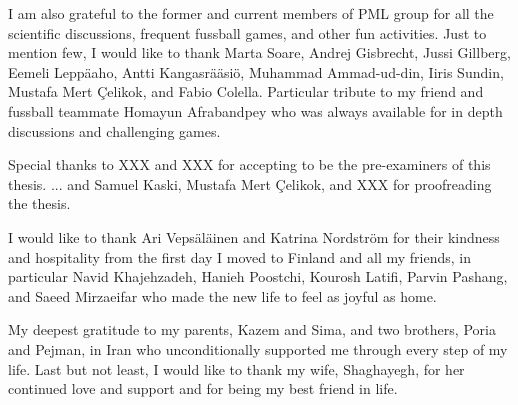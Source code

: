 \documentclass[dissertation,math,vertlayout,pdfa,colorlinks]{aaltoseries}
\begin{document}
\begin{preface}[Espoo]
I am also grateful to the former and current members of PML group for all the scientific discussions, frequent fussball games, and other fun activities. Just to mention few, I would like to thank Marta Soare, Andrej Gisbrecht, Jussi Gillberg, Eemeli Leppäaho, Antti Kangasrääsiö, Muhammad Ammad-ud-din, Iiris Sundin, Mustafa Mert \c{C}elikok, and Fabio Colella. Particular tribute to my friend and fussball teammate Homayun Afrabandpey who was always available for in depth discussions and challenging games. 

Special thanks to XXX and XXX for accepting to be the pre-examiners of this thesis. ... %
and Samuel Kaski, Mustafa Mert \c{C}elikok, and XXX for proofreading the thesis. 

I would like to thank Ari Vepsäläinen and Katrina Nordström for their kindness and hospitality from the first day I moved to Finland and all my friends, in particular Navid Khajehzadeh, Hanieh Poostchi, Kourosh Latifi, Parvin Pashang, and Saeed Mirzaeifar who made the new life to feel as joyful as home. %

My deepest gratitude to my parents, Kazem and Sima, and two brothers, Poria and Pejman, in Iran who unconditionally supported me through every step of my life. Last but not least, I would like to thank my wife, Shaghayegh, for her continued love and support and for being my best friend in life.

\end{preface}

\clearpage
\tableofcontents


\listofpublications



\end{document}
